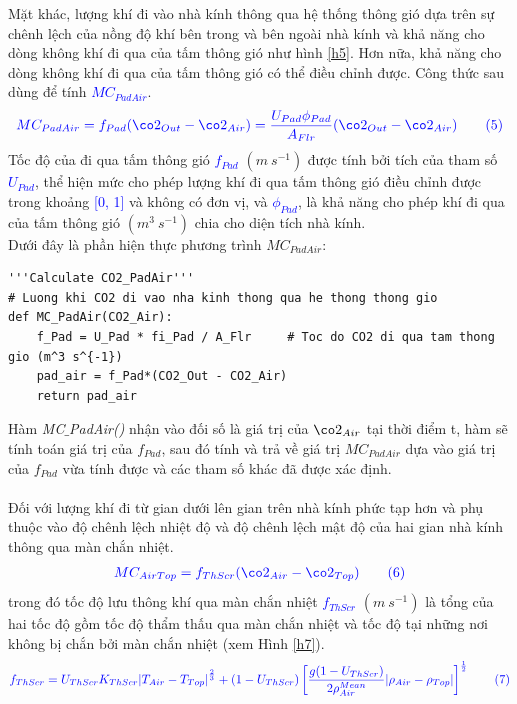 \documentclass[13pt,a4paper]{article}
\begin{document}
			Mặt khác, lượng khí  đi vào nhà kính thông qua hệ thống thông gió dựa trên sự chênh	lệch của nồng độ khí  bên trong và bên ngoài nhà kính và khả năng cho dòng không khí đi qua của tấm thông gió như hình \ref{h5}. Hơn nữa, khả năng cho dòng không khí đi qua của tấm thông gió có thể điều chỉnh được. Công thức sau dùng để tính \textcolor{blue}{$MC_{PadAir}$}.
			\begin{align}
				\color{blue}
				MC_{PadAir} = f_{Pad}(\co2_{Out} - \co2_{Air}) = \frac{U_{Pad}\phi_{Pad}}{A_{Flr}}(\co2_{Out} - \co2_{Air}) \tag{5} \label{ct5}
				\color{blue}
			\end{align}
			Tốc độ của đi qua tấm thông gió \textcolor{blue}{$f_{Pad}$} $(m\ s^{-1})$ được tính bởi tích của tham số \textcolor{blue}{$U_{Pad}$}, thể hiện mức cho phép lượng khí  đi qua tấm thông gió điều chỉnh được trong khoảng \textcolor{blue}{[0, 1]} và không	có đơn vị, và \textcolor{blue}{$\phi_{Pad}$}, là khả năng cho phép khí  đi qua của tấm thông gió $(m^3\ s^{-1})$ chia cho diện tích nhà kính. \\
			Dưới đây là phần hiện thực phương trình $MC_{PadAir}$:
\begin{lstlisting}
'''Calculate CO2_PadAir'''
# Luong khi CO2 di vao nha kinh thong qua he thong thong gio
def MC_PadAir(CO2_Air):
	f_Pad = U_Pad * fi_Pad / A_Flr     # Toc do CO2 di qua tam thong gio (m^3 s^{-1})
	pad_air = f_Pad*(CO2_Out - CO2_Air)
	return pad_air
\end{lstlisting}
			Hàm \textit{MC$\_$PadAir()} nhận vào đối số là giá trị của $\co2_{Air}$ tại thời điểm t, hàm sẽ tính toán giá trị của $f_{Pad}$, sau đó tính và trả về giá trị $MC_{PadAir}$ dựa vào giá trị của $f_{Pad}$ vừa tính được và các tham số khác đã được xác định. \\ \\
			Đối với lượng khí  đi từ gian dưới lên gian trên nhà kính phức tạp hơn và phụ thuộc vào độ chênh lệch nhiệt độ và độ chênh lệch mật độ của hai gian nhà kính thông qua màn chắn nhiệt.
			\begin{align}
				\color{blue}
					MC_{AirTop} = f_{ThScr}(\co2_{Air} - \co2_{Top}) \tag{6} \label{ct6}
				\color{blue}
			\end{align}
			trong đó tốc độ lưu thông khí  qua màn chắn nhiệt \textcolor{blue}{$f_{ThScr}$} $(m\ s^{-1})$ là tổng của hai tốc độ gồm tốc độ thẩm thấu qua màn chắn nhiệt và tốc độ tại những nơi không bị chắn bởi màn chắn nhiệt (xem Hình \ref{h7}).
			\begin{align}
				\color{blue}
					f_{ThScr} = U_{ThScr}K_{ThScr}{\vert T_{Air} - T_{Top} \vert}^{\frac{2}{3}} + (1 - U_{ThScr}) \left[\frac{g(1 - U_{ThScr})}{2\rho^{Mean}_{Air}}\vert\rho_{Air} - \rho_{Top}\vert\right]^{\frac{1}{2}}
	   			\tag{7} \label{ct7}
				\color{blue}
			\end{align}
\end{document}
